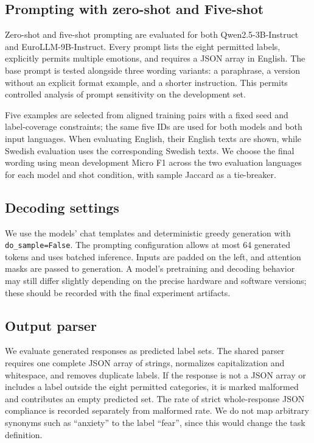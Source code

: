 \documentclass[11pt,a4paper]{article}
\begin{document}
\subsection{Prompting with zero-shot and Five-shot}
Zero-shot and five-shot prompting are evaluated for both Qwen2.5-3B-Instruct and EuroLLM-9B-Instruct. Every prompt lists the eight permitted labels, explicitly permits multiple emotions, and requires a JSON array in English. The base prompt is tested alongside three wording variants: a paraphrase, a version without an explicit format example, and a shorter instruction. This permits controlled analysis of prompt sensitivity on the development set.

Five examples are selected from aligned training pairs with a fixed seed and label-coverage constraints; the same five IDs are used for both models and both input languages. When evaluating English, their English texts are shown, while Swedish evaluation uses the corresponding Swedish texts. We choose the final wording using mean development Micro F1 across the two evaluation languages for each model and shot condition, with sample Jaccard as a tie-breaker.

\subsection{Decoding settings}
We use the models' chat templates and deterministic greedy generation with \texttt{do\_sample=False}. The prompting configuration allows at most 64 generated tokens and uses batched inference. Inputs are padded on the left, and attention masks are passed to generation. A model's pretraining and decoding behavior may still differ slightly depending on the precise hardware and software versions; these should be recorded with the final experiment artifacts.

\subsection{Output parser}
We evaluate generated responses as predicted label sets. The shared parser requires one complete JSON array of strings, normalizes capitalization and whitespace, and removes duplicate labels. If the response is not a JSON array or includes a label outside the eight permitted categories, it is marked malformed and contributes an empty predicted set. The rate of strict whole-response JSON compliance is recorded separately from malformed rate. We do not map arbitrary synonyms such as ``anxiety'' to the label ``fear'', since this would change the task definition.
\end{document}
